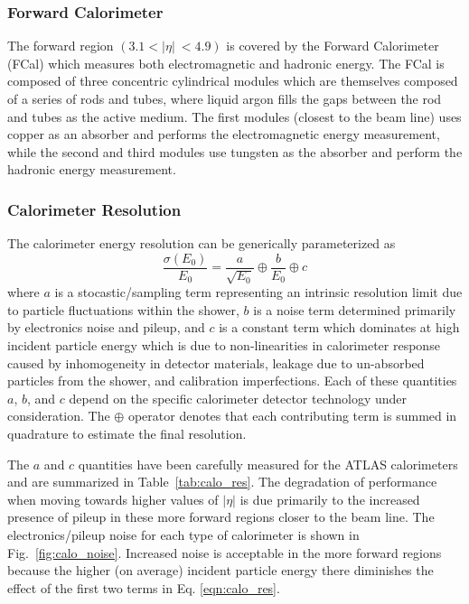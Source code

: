 \subsubsection{Forward Calorimeter}
The forward region $(3.1 < |\eta|\ < 4.9)$ is covered by the Forward Calorimeter (FCal) which measures both electromagnetic and hadronic energy.
The FCal is composed of three concentric cylindrical modules which are themselves composed of a series of rods and tubes, where liquid argon fills the gaps between the rod and tubes as the active medium.
The first modules (closest to the beam line) uses copper as an absorber and performs the electromagnetic energy measurement, while the second and third modules use tungsten as the absorber and perform the hadronic energy measurement.

\subsubsection{Calorimeter Resolution}
The calorimeter energy resolution can be generically parameterized as
\begin{equation}
    \frac{\sigma(E_0)}{E_0} = \frac{a}{\sqrt{E_0}} \oplus \frac{b}{E_0} \oplus c
    \label{eqn:calo_res}
\end{equation}
where $a$ is a stocastic/sampling term representing an intrinsic resolution limit due to particle fluctuations within the shower, $b$ is a noise term determined primarily by electronics noise and pileup, and $c$ is a constant term which dominates at high incident particle energy which is due to non-linearities in calorimeter response caused by inhomogeneity in detector materials, leakage due to un-absorbed particles from the shower, and calibration imperfections.
Each of these quantities $a$, $b$, and $c$ depend on the specific calorimeter detector technology under consideration.
The $\oplus$ operator denotes that each contributing term is summed in quadrature to estimate the final resolution.

The $a$ and $c$ quantities have been carefully measured for the ATLAS calorimeters \cite{Aharrouche_2006} \cite{Strizenec:2009zz} \cite{Cojocaru:2004jk} \cite{Adragna:2009zz} and are summarized in Table~\ref{tab:calo_res}.
The degradation of performance when moving towards higher values of $|\eta|$ is due primarily to the increased presence of pileup in these more forward regions closer to the beam line.
The electronics/pileup noise for each type of calorimeter is shown in Fig.~\ref{fig:calo_noise}.
Increased noise is acceptable in the more forward regions because the higher (on average) incident particle energy there diminishes the effect of the first two terms in Eq. \ref{eqn:calo_res}.

